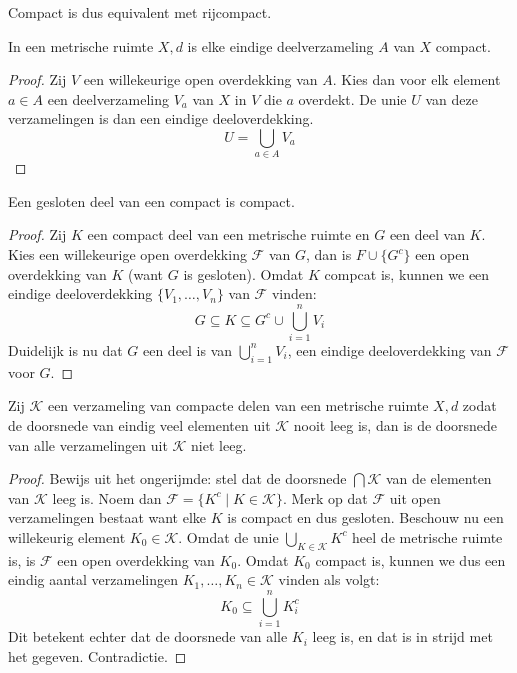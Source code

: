 \documentclass[main.tex]{subfiles}
\begin{document}
\begin{opm}
  Compact is dus equivalent met rijcompact.
\end{opm}

\begin{st}
  \label{st:eindig-dan-compact}
  In een metrische ruimte $X,d$ is elke eindige deelverzameling $A$ van $X$ compact.

  \begin{proof}
    Zij $V$ een willekeurige open overdekking van $A$.
    Kies dan voor elk element $a\in A$ een deelverzameling $V_{a}$ van $X$ in $V$ die $a$ overdekt.
    De unie $U$ van deze verzamelingen is dan een eindige deeloverdekking.
    \[ U = \bigcup_{a\in A}V_{a} \]
  \end{proof}
\end{st}

\begin{bpr}
  Een gesloten deel van een compact is compact.

  \begin{proof}
    Zij $K$ een compact deel van een metrische ruimte en $G$ een deel van $K$.
    Kies een willekeurige open overdekking $\mathcal{F}$ van $G$, dan is $F \cup \{G^{c}\}$ een open overdekking van $K$ (want $G$ is gesloten).
    Omdat $K$ compcat is, kunnen we een eindige deeloverdekking $\{V_{1},\dotsc,V_{n}\}$ van $\mathcal{F}$ vinden:
    \[ G \subseteq K \subseteq G^{c} \cup \bigcup_{i=1}^{n}V_{i} \]
    Duidelijk is nu dat $G$ een deel is van $\bigcup_{i=1}^{n}V_{i}$, een eindige deeloverdekking van $\mathcal{F}$ voor $G$.
  \end{proof}
\end{bpr}

\begin{bei}
  Zij $\mathcal{K}$ een verzameling van compacte delen van een metrische ruimte $X,d$ zodat de doorsnede van eindig veel elementen uit $\mathcal{K}$ nooit leeg is, dan is de doorsnede van alle verzamelingen uit $\mathcal{K}$ niet leeg.

  \begin{proof}
    Bewijs uit het ongerijmde: stel dat de doorsnede $\bigcap\mathcal{K}$ van de elementen van $\mathcal{K}$ leeg is.
    Noem dan $\mathcal{F} = \{K^{c}\mid K \in \mathcal{K}\}$.
    Merk op dat $\mathcal{F}$ uit open verzamelingen bestaat want elke $K$ is compact en dus gesloten.
    Beschouw nu een willekeurig element $K_{0} \in \mathcal{K}$.
    Omdat de unie $\bigcup_{K\in \mathcal{K}}K^{c}$ heel de metrische ruimte is, is $\mathcal{F}$ een open overdekking van $K_{0}$.
    Omdat $K_{0}$ compact is, kunnen we dus een eindig aantal verzamelingen $K_{1},\dotsc,K_{n} \in \mathcal{K}$ vinden als volgt:
    \[ K_{0} \subseteq \bigcup_{i=1}^{n}K_{i}^{c} \]
    Dit betekent echter dat de doorsnede van alle $K_{i}$ leeg is, en dat is in strijd met het gegeven.
    Contradictie.
  \end{proof}
\end{bei}
\end{document}
